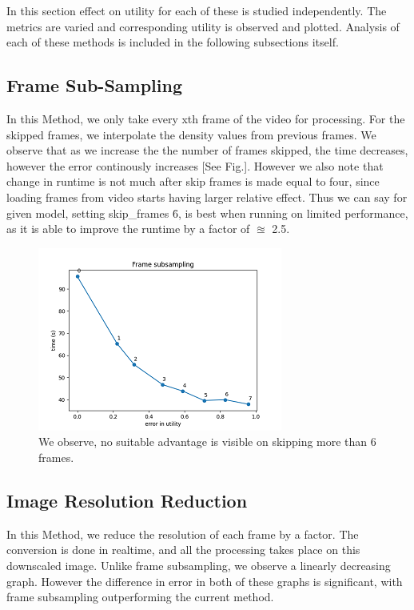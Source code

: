 \documentclass[conference]{IEEEtran}
\begin{document}
In this section effect on utility for each of these is studied independently. The metrics are varied and corresponding 
utility is observed and plotted. Analysis of each of these methods is included in the following subsections itself.

\subsection{Frame Sub-Sampling}

In this Method, we only take every xth frame of the video for processing. For the skipped frames, we interpolate 
the density values from previous frames. We observe that as we increase the the number of frames skipped, the time decreases, however the error continously increases [See Fig.].
However we also note that change in runtime is not much after skip frames is made equal to four, since loading frames from video starts having larger relative effect.
Thus we can say for given model, setting skip\_frames \= 6, is best 
when running on limited performance, as it is able to improve the runtime by a factor of $\approxeq$ 2.5.

\begin{figure}[htbp]
\centerline{\includegraphics{plots/plot_skip_frames.png}}
\caption{We observe, no suitable advantage is visible on skipping more than 6 frames.}
\label{skf_evt} 
\end{figure}


\subsection{Image Resolution Reduction}

In this Method, we reduce the resolution of each frame by a factor. The conversion is done in realtime, and all the processing takes place on this downscaled image.
Unlike frame subsampling, we observe a linearly decreasing graph. However the difference in error in both of these graphs is significant, with frame subsampling outperforming the current method.
\end{document}
